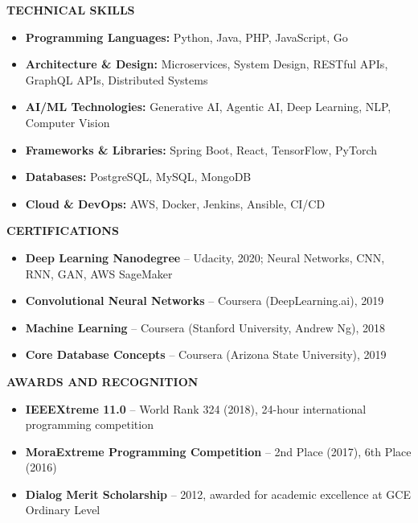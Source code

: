 \documentclass[a4paper,10pt]{article}
\newcommand{\ressection}[1]{
  \vspace{0.2em}
  \noindent\textbf{\large #1}
  \vspace{0.1em}
  \par
}
\begin{document}
\vspace{0.5em}
\ressection{TECHNICAL SKILLS}
\begin{itemize}
    \item \textbf{Programming Languages:} Python, Java, PHP, JavaScript, Go
    \item \textbf{Architecture \& Design:} Microservices, System Design, RESTful APIs, GraphQL APIs, Distributed Systems
    \item \textbf{AI/ML Technologies:} Generative AI, Agentic AI, Deep Learning, NLP, Computer Vision
    \item \textbf{Frameworks \& Libraries:} Spring Boot, React, TensorFlow, PyTorch
    \item \textbf{Databases:} PostgreSQL, MySQL, MongoDB
    \item \textbf{Cloud \& DevOps:} AWS, Docker, Jenkins, Ansible, CI/CD
\end{itemize}

\vspace{0.5em}
\ressection{CERTIFICATIONS}
\begin{itemize}
    \item \textbf{Deep Learning Nanodegree} -- Udacity, 2020; Neural Networks, CNN, RNN, GAN, AWS SageMaker
    \item \textbf{Convolutional Neural Networks} -- Coursera (DeepLearning.ai), 2019
    \item \textbf{Machine Learning} -- Coursera (Stanford University, Andrew Ng), 2018
    \item \textbf{Core Database Concepts} -- Coursera (Arizona State University), 2019
\end{itemize}

\vspace{0.5em}
\ressection{AWARDS AND RECOGNITION}
\begin{itemize}
    \item \textbf{IEEEXtreme 11.0} -- World Rank 324 (2018), 24-hour international programming competition
    \item \textbf{MoraExtreme Programming Competition} -- 2nd Place (2017), 6th Place (2016)
    \item \textbf{Dialog Merit Scholarship} -- 2012, awarded for academic excellence at GCE Ordinary Level
\end{itemize}
\end{document}
